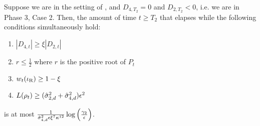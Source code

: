 \begin{lemma} \label{lemma:phase3_case2_movement_away_from_1}
Suppose we are in the setting of , and $D_{4, T_2} = 0$ and $D_{2, T_2} < 0$, i.e. we are in Phase 3, Case 2. Then, the amount of time $t \geq T_2$ that elapses while the following conditions simultaneously hold:
\begin{enumerate}
    \item $|D_{4, t}| \geq \xi |D_{2, t}|$
    \item $r \leq \frac{1}{2}$ where $r$ is the positive root of $P_t$
    \item $w_t(\iota_{\textup{R}}) \geq 1 - \xi$
    \item $L(\rho_t) \geq (\hat{\sigma}_{2, d}^2 + \hat{\sigma}_{4, d}^2) \epsilon^2$
\end{enumerate}
is at most $\frac{1}{\hat{\sigma}_{4, d}^2 \epsilon \xi^7 \kappa^{12}} \log\Big(\frac{\gamma_2}{\epsilon}\Big)$.
\end{lemma}
